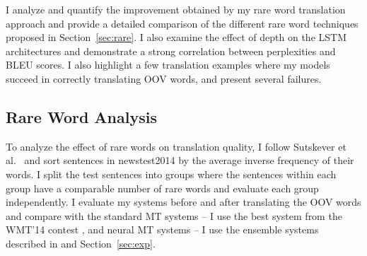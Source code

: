 I analyze and quantify the improvement obtained by my rare word translation approach and provide a detailed 
comparison of the different rare word techniques proposed in Section~\ref{sec:rare}. I also examine the effect of 
depth on the LSTM architectures and demonstrate a strong correlation between perplexities and BLEU scores. I also highlight 
a few translation examples where my models succeed in correctly translating OOV words, and present 
several failures.

\subsection{Rare Word Analysis}
\begin{sloppypar}
To analyze the effect of rare words on translation quality, 
I follow Sutskever et al.~\cite{sutskever14} and sort sentences in 
newstest2014 by the average inverse frequency of their words. 
I split the test sentences into groups where the sentences within each group have a comparable number of rare words
 and evaluate each group independently. I evaluate my 
systems before and after translating the OOV words and compare with 
the standard MT systems -- I use the best system from the WMT'14 contest \cite{durrani-EtAl:2014:W14-33},
and neural MT systems -- I use the ensemble systems described in \cite{sutskever14} and Section~\ref{sec:exp}.
\end{sloppypar}

